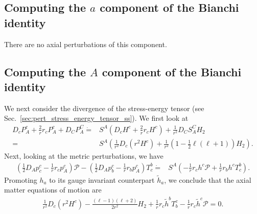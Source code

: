 \documentclass[12pt]{report}
\begin{document}
\subsection{Computing the $a$ component of the Bianchi identity}
    There are no axial perturbations of this component.
\subsection{Computing the $A$ component of the Bianchi identity}

We next consider the divergence of the stress-energy tensor
(see Sec.~\eqref{sec:pert_stress_energy_tensor_ss}). We first look at
\begin{align}
    D_cP^{c}_{A}
    +
    \frac{2}{r}r_cP^{c}_{A}
    +
    D_CP^{C}_{A}
    \dot{=}&
    S^A
    \left(
        D_cH^c
        +
        \frac{2}{r}r_cH^c
    \right)
    +
    \frac{1}{r^2}D_CS^{C}_{A} H_2
    \nonumber\\
    =&
    S^A\left(
        \frac{1}{r^2}D_c\left(r^2H^c\right)
        +
        \frac{1}{r^2}
        \left(
            1
            -
            \frac{1}{2}\ell\left(\ell+1\right)
        \right)
        H_2
    \right)
    .
\end{align}
Next, looking at the metric perturbations, we have
\begin{align}
    \left(
        \frac{1}{2}D_Ap^c_c
        -
        \frac{1}{r}r_cp^c_A
    \right)
    \mathcal{P}
    -
    \left(
        \frac{1}{2}D_Ap^c_b
        -
        \frac{1}{r}r_bp^c_A
    \right)
    T^b_c 
    \dot{=}&
    S^A
    \left(
        -
        \frac{1}{r}r_ch^c
        \mathcal{P}
        +
        \frac{1}{r}r_bh^cT^b_c
    \right)
    .
\end{align}
Promoting $h_a$ to its gauge invariant counterpart $\tilde{h}_a$,
we conclude that the axial matter equations of motion are 
\begin{align}
    \label{eq:axial_comp_A_se_eom}
    \boxed{
        \frac{1}{r^2}D_c\left(r^2H^c\right)
        -
        \frac{\left(\ell-1\right)\left(\ell+2\right)}{2r^2}
        H_2
        +
        \frac{1}{r}r_c\tilde{h}^bT^c_b
        -
        \frac{1}{r}r_c\tilde{h}^c\mathcal{P}
        =
        0
        .
    }
\end{align}

\end{document}
